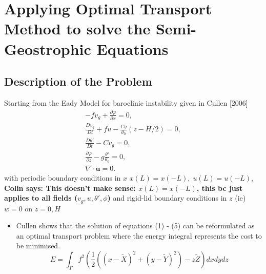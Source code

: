\documentclass[]{article}
\newcommand{\comments}[2]{{\bfseries #1 says: #2}}
\begin{document}
\section{Applying Optimal Transport Method to solve the Semi-Geostrophic Equations}
	\subsection{Description of the Problem}
	Starting from the Eady Model for baroclinic instability given in Cullen [2006]
	\begin{align}
	-fv_g + \frac{\partial \varphi}{\partial x} = 0,\\
	\frac{Dv_g}{Dt} + fu -\frac{Cg}{\theta _0}\left(z-H/2\right) = 0,\\
	\frac{D\theta'}{Dt} - Cv_g = 0,\\
	\frac{\partial \varphi}{\partial z} - g\frac{\theta'}{\theta_0} = 0,\\
	\nabla \cdot \bm{u} = 0.
	\end{align}
	with periodic boundary conditions in $x$ \color{red} $x(L) = x(-L), \; u(L) = u(-L)$, \color{black} \comments{Colin}{This doesn't make sense: $x(L)=x(-L)$, this bc just applies to all fields ($v_g,u,\theta',\phi$)}
        and rigid-lid boundary conditions in $z$ (ie) $w = 0$ on $z = 0, H$
	\begin{itemize}
		\item Cullen \cite{Cullen2008} shows that the solution of equations (1) - (5) can be reformulated as an optimal transport problem where the energy integral represents the cost to be minimised.
		\begin{equation}
		E = \int_ \Gamma f^2 \left(\frac{1}{2}\left(\left(x - \tilde{X}\right)^2 +\left(y - \tilde{Y}\right)^2\right) - z\tilde{Z}\right)dxdydz
		\end{equation}
	\end{itemize}
\end{document}
